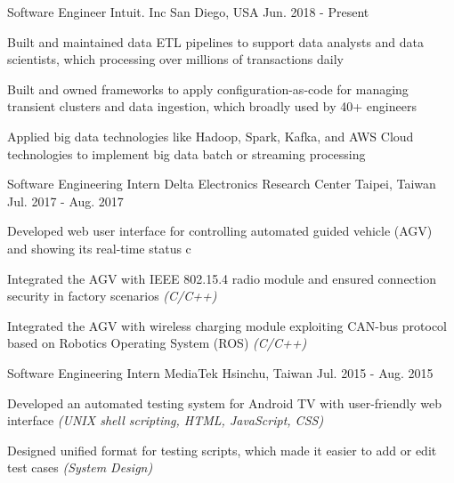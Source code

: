 \documentclass[13pt, a4paper]{awesome-cv}
\begin{document}
\makecvheader


\begin{cventries}
    \cventry
        {Software Engineer}
        {Intuit. Inc}
        {San Diego, USA}
        {Jun. 2018 - Present}
        {
        \begin{cvitems}
            \item {Built and maintained data ETL pipelines to support data analysts and data scientists, which processing over millions of transactions daily}
            \item {Built and owned frameworks to apply configuration-as-code for managing transient clusters and data ingestion, which broadly used by 40+ engineers}
            \item {Applied big data technologies like Hadoop, Spark, Kafka, and AWS Cloud technologies to implement big data batch or streaming processing}
        \end{cvitems}
        }
    
    \cventry
        {Software Engineering Intern}
        {Delta Electronics Research Center}
        {Taipei, Taiwan}
        {Jul. 2017 - Aug. 2017}
        {
        \begin{cvitems}
            \item {Developed web user interface for controlling automated guided vehicle (AGV) and showing its real-time status c}
            \item {Integrated the AGV with IEEE 802.15.4 radio module and ensured connection security in factory scenarios \textit{(C/C++)}}
            \item {Integrated the AGV with wireless charging module exploiting CAN-bus protocol based on Robotics Operating System (ROS) \textit{(C/C++)}}
        \end{cvitems}
        }
    
    \cventry
        {Software Engineering Intern}
        {MediaTek}
        {Hsinchu, Taiwan}
        {Jul. 2015 - Aug. 2015}
        {
        \begin{cvitems}
            \item {Developed an automated testing system for Android TV with user-friendly web interface \textit{(UNIX shell scripting, HTML, JavaScript, CSS)}}
            \item {Designed unified format for testing scripts, which made it easier to add or edit test cases \textit{(System Design)}}
        \end{cvitems}
        }
    

\end{cventries}
\end{document}
